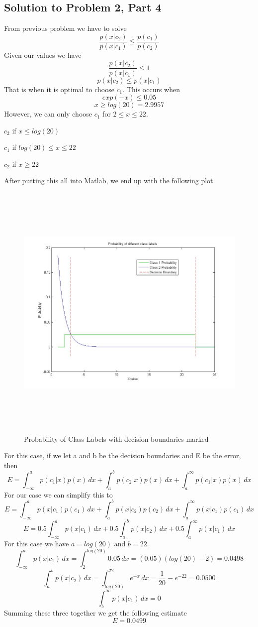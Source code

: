 \documentclass[11pt,psfig]{article}
\begin{document}
\subsection*{Solution to Problem 2, Part 4}

From previous problem we have to solve
\[
\frac{p(x|c_2)}{p(x|c_1)} \leq \frac{p(c_1)}{p(c_2)}
\]
Given our values we have
\[
\frac{p(x|c_2)}{p(x|c_1)} \leq 1
\]
\[
p(x|c_2) \leq p(x|c_1)
\]
That is when it is optimal to choose $c_1$. This occurs when
\[
exp(-x) \leq 0.05
\]
\[
x \geq log(20) = 2.9957
\]
However, we can only choose $c_1$ for $2 \leq x \leq 22$. 

$c_2$ if $x \leq log(20)$

$c_1$ if $log(20) \leq x \leq 22$

$c_2$ if $x \geq 22$

After putting this all into Matlab, we end up with the following plot
\begin{figure}[H]
\centering
\includegraphics[height=5in]{prob2part2plot.jpg}
\caption{Probability of Class Labels with decision boundaries marked}
\end{figure}

For this case, if we let a and b be the decision boundaries and E be the error, then
\[
E = \int_{-\infty}^{a}{p(c_1|x)p(x) \, dx} + \int_{a}^{b}{p(c_2|x)p(x) \, dx} + \int_{a}^{\infty}{p(c_1|x)p(x) \, dx}
\]
For our case we can simplify this to
\[
E = \int_{-\infty}^{a}{p(x|c_1)p(c_1) \, dx} + \int_{a}^{b}{p(x|c_2)p(c_2) \, dx} + \int_{a}^{\infty}{p(x|c_1)p(c_1) \, dx}
\]
\[
E = 0.5\int_{-\infty}^{a}{p(x|c_1) \, dx} + 0.5\int_{a}^{b}{p(x|c_2) \, dx} + 0.5\int_{a}^{\infty}{p(x|c_1) \, dx}
\]
For this case we have $a=log(20)$ and $b=22$. \\
\[
\int_{-\infty}^{a}{p(x|c_1) \, dx} = \int_{2}^{log(20)}{0.05 \, dx} = (0.05)(log(20)-2) = 0.0498
\]
\[
\int_{a}^{b}{p(x|c_2) \, dx} = \int_{log(20)}^{22}{e^{-x} \, dx} = \frac{1}{20} - e^{-22} = 0.0500
\]
\[
\int_{b}^{\infty}{p(x|c_1) \, dx} = 0
\]
Summing these three together we get the following estimate
\[
E = 0.0499
\]
\end{document}
